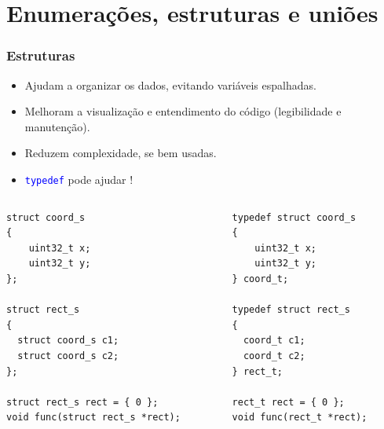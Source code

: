 \documentclass{beamer}
\begin{document}
\section{Enumerações, estruturas e uniões}

\begin{frame}[fragile]
	\frametitle{Estruturas}
	\begin{itemize}
	\item Ajudam a organizar os dados, evitando variáveis espalhadas.
	\item Melhoram a visualização e entendimento do código (legibilidade e manutenção).
	\item Reduzem complexidade, se bem usadas.
	\item \texttt{\textcolor{blue}{typedef}} pode ajudar !
	\end{itemize}
	\begin{columns}[T] %
		\begin{column}{.5\textwidth}
	\begin{lstlisting}[style=customc]
struct coord_s
{
	uint32_t x;
	uint32_t y;
};

struct rect_s
{
  struct coord_s c1;
  struct coord_s c2;
};

struct rect_s rect = { 0 };
void func(struct rect_s *rect);
	\end{lstlisting}
		\end{column}%
		\hfill%
		\begin{column}{.5\textwidth}
	\begin{lstlisting}[style=customc]
typedef struct coord_s
{
	uint32_t x;
	uint32_t y;
} coord_t;

typedef struct rect_s
{
  coord_t c1;
  coord_t c2;
} rect_t;

rect_t rect = { 0 };
void func(rect_t *rect);
	\end{lstlisting}
		\end{column}%
	\end{columns}
\end{frame}
\end{document}
